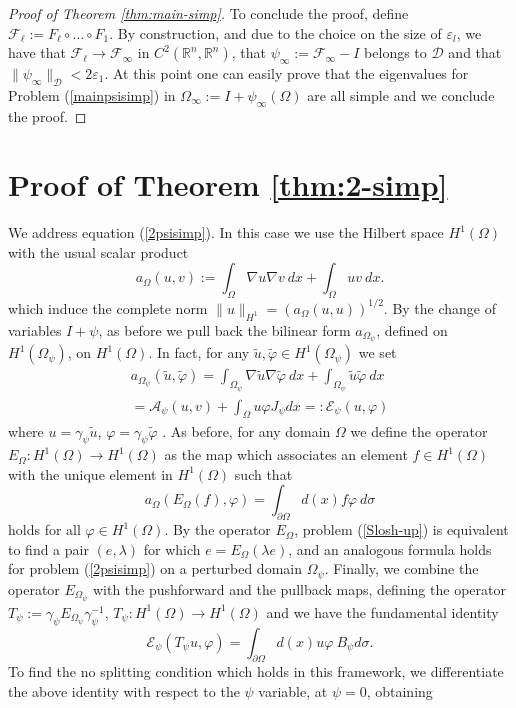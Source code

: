 \documentclass[a4paper,reqno,11pt,oneside]{amsart}
\theoremstyle{plain}
\theoremstyle{plain}
\theoremstyle{plain}
\theoremstyle{remark}
\begin{document}
\begin{proof}[Proof of Theorem  \ref{thm:main-simp}]
To conclude the proof, define $\mathcal{F}_\ell:=F_\ell\circ\dots\circ F_1$. By construction, and due to the choice on the size of $\varepsilon_l$, we have that $\mathcal{F}_\ell\rightarrow \mathcal{F}_\infty$ in $C^2(\mathbb{R}^n,\mathbb{R}^n)$, that $\psi_\infty:=\mathcal{F}_\infty-I$ belongs to $\mathcal{D}$ and that $\|\psi_\infty\|_\mathcal{D}<2\varepsilon_1$. At this point one can easily prove that  the eigenvalues for Problem (\ref{mainpsisimp}) in $\Omega_\infty:=I+\psi_\infty(\Omega)$ are all simple and we conclude the proof. 
\end{proof}

\section{Proof of Theorem \ref{thm:2-simp}}\label{sec:sloshup}
We address equation (\ref{2psisimp}). In this case we use the Hilbert space $H^1(\Omega)$ with the usual scalar product 
\[
a_{\Omega}(u,v):=\int_\Omega \nabla u \nabla v \ dx +\int_{ \Omega} uv\ dx .
\]
which induce the complete norm $\|u\|_{H^1}=\left(a_{\Omega}(u,u)\right)^{1/2}$. By the change of variables $I+\psi$, as before we pull back the bilinear form $a_{\Omega_\psi} $, defined  on $H^1 (\Omega_\psi)$, on $H^1(\Omega)$. In fact, for any $\tilde u,\tilde \varphi\in H^1 (\Omega_\psi)$ we set
\begin{multline}
    a_{\Omega_\psi}(\tilde u,\tilde \varphi)=
   \int_{ \Omega_\psi}\nabla \tilde u\nabla\tilde \varphi\  dx
    +\int_{ \Omega_\psi}\tilde u\tilde \varphi\ dx 
    \\
    =\mathcal{A}_\psi (u,v)
    +\int_{ \Omega} u \varphi J_\psi dx =:\mathcal{E}_\psi (u,\varphi) 
\end{multline}
 where $u=\gamma_{\psi}\tilde u$, $\varphi=\gamma_{\psi} \tilde \varphi$ .   
 As before, for any domain $\Omega$ we define the operator $E_\Omega: H^1(\Omega)\rightarrow H^1(\Omega)$  as the map which associates an element $f\in H^1(\Omega)$ with the unique element in $ H^1(\Omega)$ such that
\begin{equation}
 a_{\Omega}(E_\Omega(f),\varphi)=\int_{\partial \Omega} d(x)f\varphi\  d\sigma 
\end{equation}
holds for all $\varphi \in H^1 (\Omega)$. By the operator $E_\Omega$, problem (\ref{Slosh-up}) is equivalent to find a pair $(e,\lambda)$ for which $e=E_\Omega(\lambda e)$, and an analogous formula holds for  problem (\ref{2psisimp}) on a perturbed domain $\Omega_\psi$.
Finally, we combine the operator $E_{\Omega_\psi}$ with the pushforward and the pullback maps, defining the operator $T_\psi:=\gamma_\psi E_{\Omega_\psi}\gamma_\psi^{-1}$, $T_\psi : H^1(\Omega)\rightarrow H^1(\Omega)$ and we have the fundamental identity 
\begin{equation}
    \mathcal{E}_\psi (T_\psi u,\varphi)=\int_{\partial \Omega} d(x)u\varphi\ B_\psi d\sigma .
\end{equation} 
To find the no splitting condition which holds in this framework, we differentiate the above identity with respect to the $\psi$ variable, at $\psi=0$, obtaining
 
\end{document}
